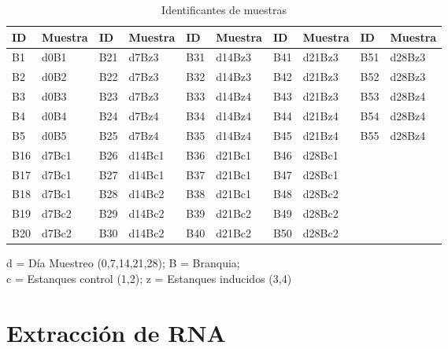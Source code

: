 \documentclass[12pt,letterpaper,oneside]{scrbook}
\begin{document}
\begin{table}[h!]
    \begin{center}
        \begin{threeparttable}
            \caption{Identificantes de muestras}\label{tablaidentificantes}
            \begin{tabular}{l l l l l l l l l l}
                \toprule
                ID & Muestra & ID & Muestra & ID & Muestra & ID & Muestra & ID & Muestra\\
                \midrule
                B1 & d0B1 & B21 & d7Bz3 & B31 & d14Bz3 & B41 & d21Bz3 & B51 & d28Bz3 \\
                B2 & d0B2 & B22 & d7Bz3 & B32 & d14Bz3 & B42 & d21Bz3 & B52 & d28Bz3 \\
                B3 & d0B3 & B23 & d7Bz3 & B33 & d14Bz4 & B43 & d21Bz3 & B53 & d28Bz4 \\
                B4 & d0B4 & B24 & d7Bz4 & B34 & d14Bz4 & B44 & d21Bz4 & B54 & d28Bz4 \\
                B5 & d0B5 & B25 & d7Bz4 & B35 & d14Bz4 & B45 & d21Bz4 & B55 & d28Bz4 \\
                B16 & d7Bc1 & B26 & d14Bc1 & B36 & d21Bc1 & B46 & d28Bc1 & \\
                B17 & d7Bc1 & B27 & d14Bc1 & B37 & d21Bc1 & B47 & d28Bc1 & \\
                B18 & d7Bc1 & B28 & d14Bc2 & B38 & d21Bc1 & B48 & d28Bc2 & \\
                B19 & d7Bc2 & B29 & d14Bc2 & B39 & d21Bc2 & B49 & d28Bc2 & \\
                B20 & d7Bc2 & B30 & d14Bc2 & B40 & d21Bc2 & B50 & d28Bc2 & \\
                \bottomrule
            \end{tabular}
            \begin{tablenotes}
                \item   d = Día Muestreo (0,7,14,21,28); B = Branquia; \\
                        c = Estanques control (1,2); z = Estanques inducidos (3,4)
            \end{tablenotes}
        \end{threeparttable}
    \end{center}
\end{table}

\clearpage

\section{Extracción de RNA}\label{extraccionrna}
\end{document}
